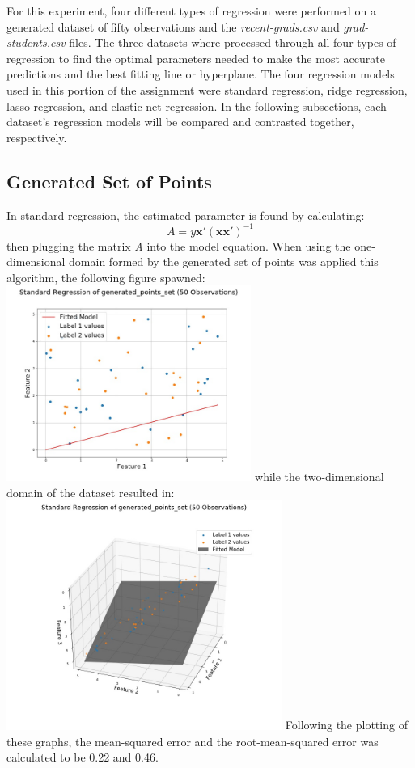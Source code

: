 \documentclass[a4paper,12pt]{IEEEtran}
\begin{document}
For this experiment, four different types of regression were performed on a generated dataset of fifty observations and the \textit{recent-grads.csv} and \textit{grad-students.csv} files. The three datasets where processed through all four types of regression to find the optimal parameters needed to make the most accurate predictions and the best fitting line or hyperplane. The four regression models used in this portion of the assignment were standard regression, ridge regression, lasso regression, and elastic-net regression. In the following subsections, each dataset's regression models will be compared and contrasted together, respectively.

\subsection{Generated Set of Points}
\label{gen_set}
In standard regression, the estimated parameter is found by calculating: \[\textit{A} = \textit{y}\textbf{x}'(\textbf{x}\textbf{x}')^{-1}\] then plugging the matrix \textit{A} into the model equation. When using the one-dimensional domain formed by the generated set of points was applied this algorithm, the following figure spawned: \includegraphics[width=8cm]{std_reg_1d_generated_points_set} while the two-dimensional domain of the dataset resulted in: \includegraphics[width=9cm]{std_reg_2d_generated_points_set} Following the plotting of these graphs, the mean-squared error and the root-mean-squared error was calculated to be 0.22 and 0.46.
\end{document}
